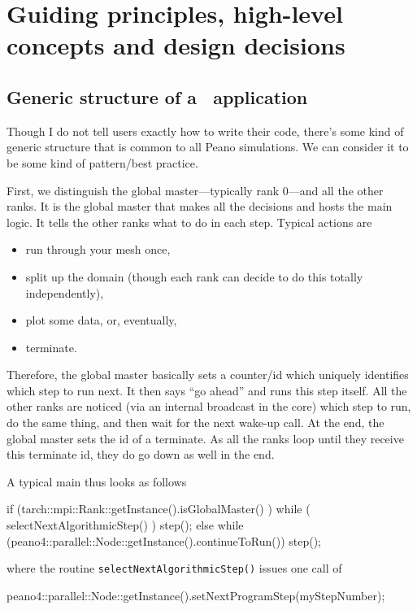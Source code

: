 \chapter{Guiding principles, high-level concepts and design decisions}


\section{Generic structure of a \Peano\  application}

Though I do not tell users exactly how to write their code, there's some kind of
generic structure that is common to all Peano simulations.
We can consider it to be some kind of pattern/best practice.


First, we distinguish the global master---typically rank 0---and all the other
ranks.
It is the global master that makes all the decisions and hosts the main logic.
It tells the other ranks what to do in each step. 
Typical actions are
\begin{itemize}
  \item run through your mesh once,
  \item split up the domain (though each rank can decide to do this totally
  independently),
  \item plot some data, or, eventually,
  \item terminate.
\end{itemize}


Therefore, the global master basically sets a counter/id which uniquely
identifies which step to run next.
It then says ``go ahead'' and runs this step itself.
All the other ranks are noticed (via an internal broadcast in the core) which
step to run, do the same thing, and then wait for the next wake-up call.
At the end, the global master sets the id of a terminate.
As all the ranks loop until they receive this terminate id, they do go down as
well in the end.


A typical main thus looks as follows
\begin{code}
  if (tarch::mpi::Rank::getInstance().isGlobalMaster() ) {
    while ( selectNextAlgorithmicStep() ) {
      step();
    }
  }
  else {
    while (peano4::parallel::Node::getInstance().continueToRun()) {
      step();
    }
  }
\end{code}


\noindent
where the routine \texttt{selectNextAlgorithmicStep()} issues one call of
\begin{code}
peano4::parallel::Node::getInstance().setNextProgramStep(myStepNumber);
\end{code}


